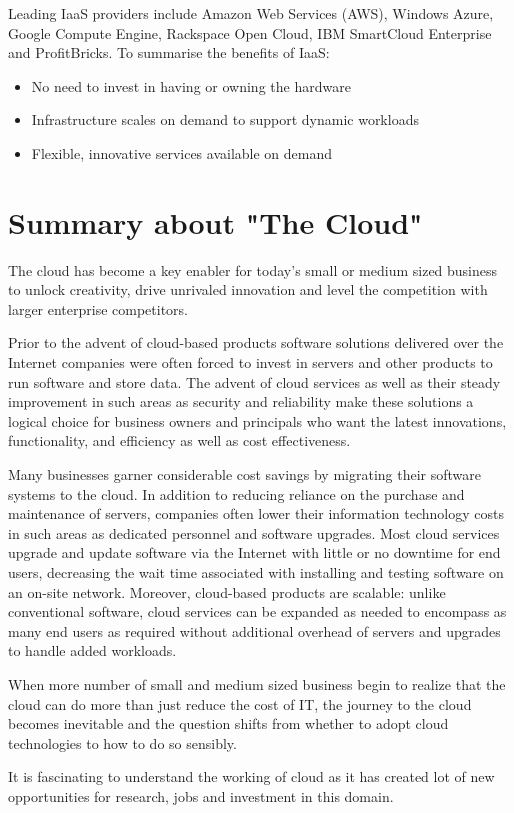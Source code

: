 Leading IaaS providers include Amazon Web Services (AWS), Windows Azure, Google Compute Engine, Rackspace Open Cloud, IBM SmartCloud Enterprise and ProfitBricks.
To summarise the benefits of IaaS:
\begin{itemize}
	\item No need to invest in having or owning the hardware
	\item Infrastructure scales on demand to support dynamic workloads
	\item Flexible, innovative services available on demand
\end{itemize}

\section{Summary about "The Cloud"}\label{sec:intro1_summary}
The cloud has become a key enabler for today's small or medium sized business to unlock creativity, drive unrivaled innovation and level the competition with larger enterprise competitors.

Prior to the advent of cloud-based products software solutions delivered over the Internet companies were often forced to invest in servers and other products to run software and store data. The advent of cloud services as well as their steady improvement in such areas as security and reliability make these solutions a logical choice for business owners and principals who want the latest innovations, functionality, and efficiency as well as cost effectiveness.

Many businesses garner considerable cost savings by migrating their software systems to the cloud. In addition to reducing reliance on the purchase and maintenance of servers, companies often lower their information technology costs in such areas as dedicated personnel and software upgrades. Most cloud services upgrade and update software via the Internet with little or no downtime for end users, decreasing the wait time associated with installing and testing software on an on-site network. Moreover, cloud-based products are scalable: unlike conventional software, cloud services can be expanded as needed to encompass as many end users as required without additional overhead of servers and upgrades to handle added workloads.

When more number of small and medium sized business begin to realize that the cloud can do more than just reduce the cost of IT, the journey to the cloud becomes inevitable and the question shifts from whether to adopt cloud technologies to how to do so sensibly.

It is fascinating to understand the working of cloud as it has created lot of new opportunities for research, jobs and investment in this domain.